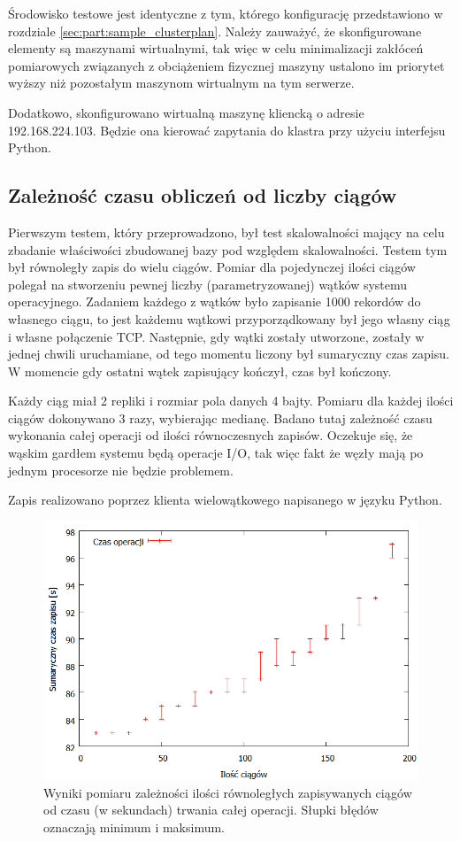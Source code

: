 \documentclass[a4paper,polish,12pt,twoside]{article}
\begin{document}
Środowisko testowe jest identyczne z tym, którego konfigurację przedstawiono w rozdziale \ref{sec:part:sample_clusterplan}. Należy zauważyć, że skonfigurowane elementy są maszynami wirtualnymi, tak więc w celu minimalizacji zakłóceń pomiarowych związanych z obciążeniem fizycznej maszyny ustalono im priorytet wyższy niż pozostałym maszynom wirtualnym na tym serwerze.

Dodatkowo, skonfigurowano wirtualną maszynę kliencką o adresie 192.168.224.103. Będzie ona kierować zapytania do klastra przy użyciu interfejsu Python.

	\subsection{Zależność czasu obliczeń od liczby ciągów}
Pierwszym testem, który przeprowadzono, był test skalowalności mający na celu zbadanie właściwości zbudowanej bazy pod względem skalowalności. Testem tym był równoległy zapis do wielu ciągów. 
	Pomiar dla pojedynczej ilości ciągów polegał na stworzeniu pewnej liczby (parametryzowanej) wątków systemu operacyjnego. Zadaniem każdego z wątków było zapisanie 1000 rekordów do własnego ciągu, to jest każdemu wątkowi przyporządkowany był jego własny ciąg i własne połączenie TCP. Następnie, gdy wątki zostały utworzone, zostały w jednej chwili uruchamiane, od tego momentu liczony był sumaryczny czas zapisu. W momencie gdy ostatni wątek zapisujący kończył, czas był kończony.

Każdy ciąg miał 2 repliki i rozmiar pola danych 4 bajty. Pomiaru dla każdej ilości ciągów dokonywano 3 razy, wybierając medianę. Badano tutaj zależność czasu wykonania całej operacji od ilości równoczesnych zapisów. Oczekuje się, że wąskim gardłem systemu będą operacje I/O, tak więc fakt że węzły mają po jednym procesorze nie będzie problemem.

Zapis realizowano poprzez klienta wielowątkowego napisanego w języku Python.
	\begin{figure}[h]
		\centering \includegraphics[width=14cm]{test_plot1}
		\caption[Wyniki pomiaru zależności ilości równoległych zapisywanych ciągów od czasu trwania całej operacji]{Wyniki pomiaru zależności ilości równoległych zapisywanych ciągów od czasu (w sekundach) trwania całej operacji. Słupki błędów oznaczają minimum i maksimum.}
		\label{fig:test:plot1}
	\end{figure}
\end{document}
